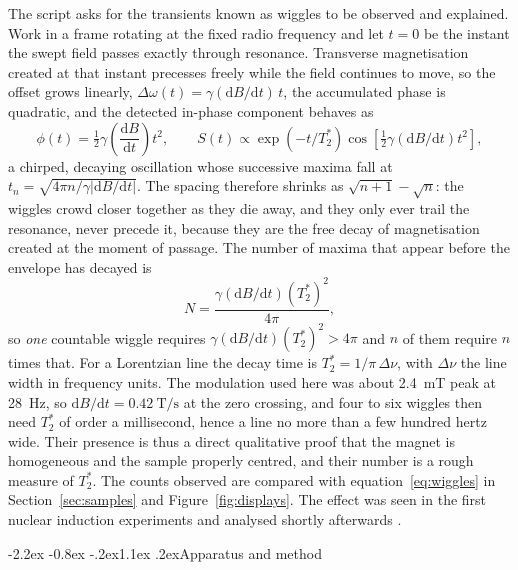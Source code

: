 \documentclass[11pt,a4paper]{article}
\makeatletter
\renewcommand\section{\@startsection{section}{1}{\z@}%
  {-2.2ex \@plus -0.8ex \@minus -.2ex}{1.1ex \@plus .2ex}{\normalfont\large\bfseries}}
\makeatother
\begin{document}
The script asks for the transients known as wiggles to be observed and explained. Work in a frame
rotating at the fixed radio frequency and let $t = 0$ be the instant the swept field passes exactly
through resonance. Transverse magnetisation created at that instant precesses freely while the
field continues to move, so the offset grows linearly,
$\Delta\omega(t) = \gamma(\mathrm{d}B/\mathrm{d}t)\,t$, the accumulated phase is quadratic, and
the detected in-phase component behaves as
\begin{equation}
\phi(t) = \tfrac{1}{2}\gamma\left(\frac{\mathrm{d}B}{\mathrm{d}t}\right)t^{2} ,
\qquad
S(t) \propto \exp\left(-t/T_2^{*}\right)\cos\!\left[\tfrac{1}{2}\gamma\left(\mathrm{d}B/\mathrm{d}t\right)t^{2}\right] ,
\end{equation}
a chirped, decaying oscillation whose successive maxima fall at
$t_n = \sqrt{4\pi n / \gamma|\mathrm{d}B/\mathrm{d}t|}$. The spacing therefore shrinks as
$\sqrt{n+1}-\sqrt{n}$: the wiggles crowd closer together as they die away, and they only ever
trail the resonance, never precede it, because they are the free decay of magnetisation created at
the moment of passage. The number of maxima that appear before the envelope has decayed is
\begin{equation}
N = \frac{\gamma\left(\mathrm{d}B/\mathrm{d}t\right)\left(T_2^{*}\right)^{2}}{4\pi} ,
\label{eq:wiggles}
\end{equation}
so \emph{one} countable wiggle requires $\gamma(\mathrm{d}B/\mathrm{d}t)(T_2^{*})^{2} > 4\pi$ and
$n$ of them require $n$ times that. For a Lorentzian line the decay time is
$T_2^{*} = 1/\pi\,\Delta\nu$, with $\Delta\nu$ the line width in frequency units. The modulation
used here was about \SI{2.4}{\milli\tesla} peak at \SI{28}{\hertz}, so
$\mathrm{d}B/\mathrm{d}t = \SI{0.42}{\tesla\per\second}$ at the zero crossing, and four to six
wiggles then need $T_2^{*}$ of order a millisecond, hence a line no more than a few hundred hertz
wide. Their presence is thus a direct qualitative proof that the magnet is homogeneous and the
sample properly centred, and their number is a rough measure of $T_2^{*}$. The counts observed
are compared with equation~\eqref{eq:wiggles} in Section~\ref{sec:samples} and
Figure~\ref{fig:displays}. The effect was seen in the first nuclear induction experiments
\cite{bloch} and analysed shortly afterwards \cite{jacobsohn}.

\section{Apparatus and method}
\label{sec:apparatus}
\end{document}
